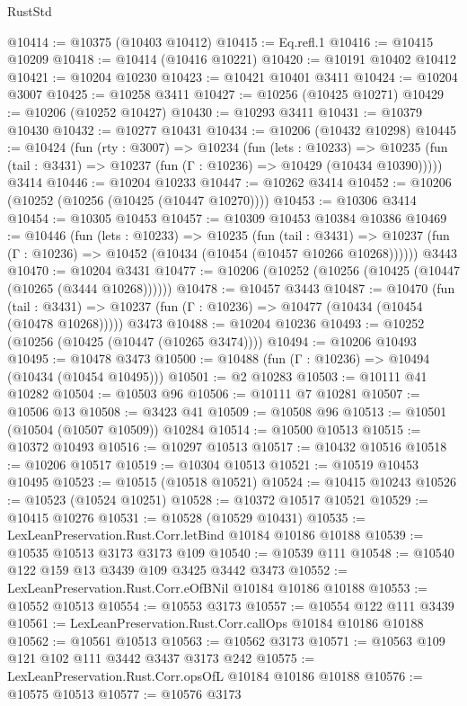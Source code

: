 \begin{lexlean}{RustStd}
\begin{coremodule}
@10414 := @10375 (@10403 @10412)
@10415 := Eq.refl.{1}
@10416 := @10415 @10209
@10418 := @10414 (@10416 @10221)
@10420 := @10191 @10402 @10412
@10421 := @10204 @10230
@10423 := @10421 @10401 @3411
@10424 := @10204 @3007
@10425 := @10258 @3411
@10427 := @10256 (@10425 @10271)
@10429 := @10206 (@10252 @10427)
@10430 := @10293 @3411
@10431 := @10379 @10430
@10432 := @10277 @10431
@10434 := @10206 (@10432 @10298)
@10445 := @10424
    (fun (rty : @3007) =>
    @10234
      (fun (lets : @10233) =>
      @10235 (fun (tail : @3431) => @10237 (fun (Γ : @10236) => @10429 (@10434 @10390)))))
    @3414
@10446 := @10204 @10233
@10447 := @10262 @3414
@10452 := @10206 (@10252 (@10256 (@10425 (@10447 @10270))))
@10453 := @10306 @3414
@10454 := @10305 @10453
@10457 := @10309 @10453 @10384 @10386
@10469 := @10446
    (fun (lets : @10233) =>
    @10235
      (fun (tail : @3431) =>
      @10237 (fun (Γ : @10236) => @10452 (@10434 (@10454 (@10457 @10266 @10268))))))
    @3443
@10470 := @10204 @3431
@10477 := @10206 (@10252 (@10256 (@10425 (@10447 (@10265 (@3444 @10268))))))
@10478 := @10457 @3443
@10487 := @10470
    (fun (tail : @3431) => @10237 (fun (Γ : @10236) => @10477 (@10434 (@10454 (@10478 @10268)))))
    @3473
@10488 := @10204 @10236
@10493 := @10252 (@10256 (@10425 (@10447 (@10265 @3474))))
@10494 := @10206 @10493
@10495 := @10478 @3473
@10500 := @10488 (fun (Γ : @10236) => @10494 (@10434 (@10454 @10495)))
@10501 := @2 @10283
@10503 := @10111 @41 @10282
@10504 := @10503 @96
@10506 := @10111 @7 @10281
@10507 := @10506 @13
@10508 := @3423 @41
@10509 := @10508 @96
@10513 := @10501 (@10504 (@10507 @10509)) @10284
@10514 := @10500 @10513
@10515 := @10372 @10493
@10516 := @10297 @10513
@10517 := @10432 @10516
@10518 := @10206 @10517
@10519 := @10304 @10513
@10521 := @10519 @10453 @10495
@10523 := @10515 (@10518 @10521)
@10524 := @10415 @10243
@10526 := @10523 (@10524 @10251)
@10528 := @10372 @10517 @10521
@10529 := @10415 @10276
@10531 := @10528 (@10529 @10431)
@10535 := LexLeanPreservation.Rust.Corr.letBind @10184 @10186 @10188
@10539 := @10535 @10513 @3173 @3173 @109
@10540 := @10539 @111
@10548 := @10540 @122 @159 @13 @3439 @109 @3425 @3442 @3473
@10552 := LexLeanPreservation.Rust.Corr.eOfBNil @10184 @10186 @10188
@10553 := @10552 @10513
@10554 := @10553 @3173
@10557 := @10554 @122 @111 @3439
@10561 := LexLeanPreservation.Rust.Corr.callOps @10184 @10186 @10188
@10562 := @10561 @10513
@10563 := @10562 @3173
@10571 := @10563 @109 @121 @102 @111 @3442 @3437 @3173 @242
@10575 := LexLeanPreservation.Rust.Corr.opsOfL @10184 @10186 @10188
@10576 := @10575 @10513
@10577 := @10576 @3173

\end{coremodule}
\end{lexlean}
